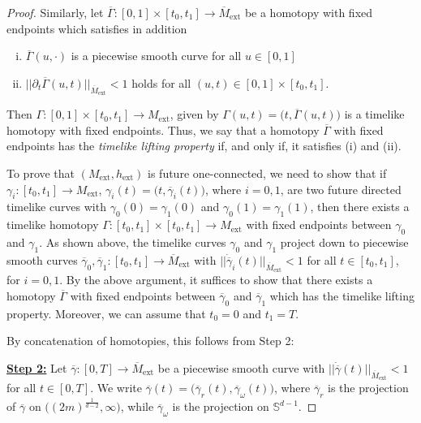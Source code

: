\documentclass[reqno]{article}
\newcommand{\Mext}{M_{\mathrm{ext}}}
\newcommand{\hext}{h_\mathrm{ext}}
\newcommand{\ovg}{\overline{\gamma}}
\newcommand{\oMe}{\overline{M}_\mathrm{ext}}
\begin{document}
\begin{proof}
Similarly, let $\overline{\Gamma} : [0,1] \times [t_0, t_1] \to \oMe$ be a homotopy with fixed endpoints which satisfies in addition
\begin{enumerate}[(i)] 
\item $\overline{\Gamma}(u, \cdot)$ is a piecewise smooth curve for all $u \in [0,1]$ 
\item $||\partial_t \overline{\Gamma}(u,t) ||_{\oMe} < 1$ holds for all $(u,t) \in [0,1] \times [t_0, t_1]$.
\end{enumerate} 
Then $\Gamma : [0,1] \times [t_0, t_1] \to \Mext$, given by $\Gamma (u,t) = \big(t, \overline{\Gamma}(u,t)\big)$ is a timelike homotopy with fixed endpoints. Thus, we say that a homotopy $\overline{\Gamma}$ with fixed endpoints has the \emph{timelike lifting property} if, and only if, it satisfies (i) and (ii).



To prove that $(\Mext, \hext)$ is future one-connected, we need to show that if $\gamma_i : [t_0, t_1] \to \Mext$, $\gamma_i(t) = \big(t, \overline{\gamma}_i(t)\big)$, where $i=0,1$, are two future directed timelike curves with $\gamma_0(0) = \gamma_1(0)$ and $\gamma_0(1) = \gamma_1(1)$, then there exists a timelike homotopy $\Gamma : [t_0,t_1] \times [t_0,t_1] \to \Mext$ with fixed endpoints between $\gamma_0$ and $\gamma_1$. As shown above, the timelike curves $\gamma_0$ and $\gamma_1$ project down to piecewise smooth curves $\overline{\gamma}_0, \overline{\gamma}_1 : [t_0, t_1] \to \overline{M}_{\mathrm{ext}}$ with $||\dot{\overline{\gamma}}_i(t)||_{\overline{M}_{\mathrm{ext}}} < 1$ for all $t \in [t_0, t_1]$, for $i = 0,1$. 
By the above argument, it suffices to show that there exists a homotopy $\overline{\Gamma}$ with fixed endpoints between $\overline{\gamma}_0$ and $\overline{\gamma}_1$ which has the timelike lifting property. Moreover, we can assume that $t_0 = 0$ and $t_1 = T$.

By concatenation of homotopies, this follows from Step 2:
\vspace*{2mm}

\underline{\textbf{Step 2:}} Let $\overline{\gamma} : [0, T] \to \overline{M}_{\mathrm{ext}}$ be a piecewise smooth curve with $||\dot{\overline{\gamma}}(t)||_{\overline{M}_{\mathrm{ext}}} < 1$ for all $t \in [0, T]$. We write $\overline{\gamma}(t) = \big(\ovg_r(t), \ovg_\omega(t)\big)$, where $\ovg_r$ is the projection of $\ovg$ on $\big((2m)^{\frac{1}{d-2}}, \infty\big)$, while $\ovg_\omega$ is the projection on $\mathbb{S}^{d-1}$. 


\end{proof}
\end{document}
